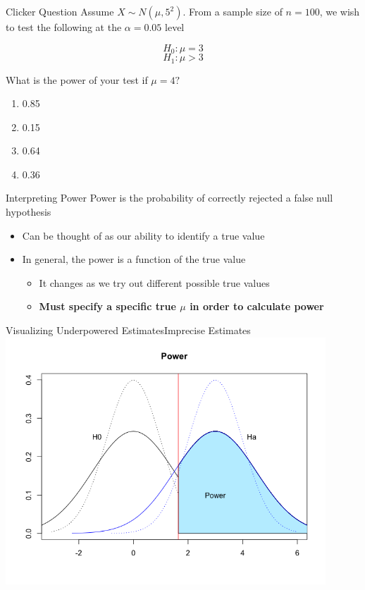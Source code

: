 \documentclass{beamer}
\begin{document}
\begin{frame}{Clicker Question}
	Assume $X\sim N(\mu,5^2)$. From a sample size of $n=100$, we wish to test the following at the $\alpha=0.05$ level

	\[
		H_0: \mu=3
	\]
	\[
		H_1: \mu>3
	\]
	
	What is the power of your test if $\mu=4?$
	\begin{enumerate}[label=(\alph*)]
		\item 0.85
		\item 0.15
		\item 0.64
		\item 0.36
	\end{enumerate}
\end{frame}


\begin{frame}{Interpreting Power}
	Power is the probability of correctly rejected a false null hypothesis
	\begin{itemize}
		\item Can be thought of as our ability to identify a true value
	\end{itemize}
	\begin{itemize}
		\item In general, the power is a function of the true value
			\begin{itemize}
		      	\item It changes as we try out different possible true values
		      	
		      	\item \textbf{Must specify a specific true $\mu$ in order to calculate power} 
			\end{itemize}
	\end{itemize}
\end{frame}


\begin{frame}{Visualizing Underpowered Estimates}{Imprecise Estimates}
	\includegraphics[width=0.9\textwidth]{underpoweredimprecise.png}
\end{frame}
\end{document}
